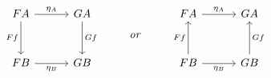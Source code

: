 \documentclass{article}
\begin{document}
    \begin{equation*}
        \begin{tikzcd}[column sep=3em, row sep=3em]
            FA \ar[r, "\eta_A"] \ar[d, "Ff"'] & GA \ar[d, "Gf"] \\
            FB \ar[r, "\eta_B"'] & GB
        \end{tikzcd}\ \ \ \ \ \ \ \ \mathit{or}\ \ \ \ \ \ \ \ 
        \begin{tikzcd}[column sep=3em, row sep=3em]
            FA \ar[r, "\eta_A"] & GA \\
            FB \ar[r, "\eta_B"'] \ar[u, "Ff"] & GB \ar[u, "Gf"']
        \end{tikzcd}
    \end{equation*}
\end{document}
